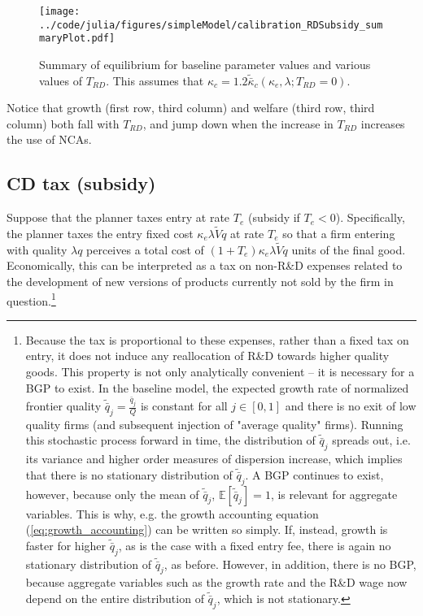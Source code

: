 \documentclass[11pt,english]{article}
\theoremstyle{remark}
\begin{document}
\begin{figure}[]
	\texttt{[image: ../code/julia/figures/simpleModel/calibration\_RDSubsidy\_summaryPlot.pdf]}
	\caption{Summary of equilibrium for baseline parameter values and various values of $T_{RD}$. This assumes that $\kappa_c = 1.2 \tilde{\bar{\kappa}}_c(\kappa_e,\lambda;T_{RD} = 0)$.}
	\label{calibration_RDSubsidy_summaryPlot}
\end{figure}

Notice that growth (first row, third column) and welfare (third row, third column) both fall with $T_{RD}$, and jump down when the increase in $T_{RD}$ increases the use of NCAs.


\subsection{CD tax (subsidy)}\label{subsec:cd_tax}

Suppose that the planner taxes entry at rate $T_e$ (subsidy if $T_e < 0$). Specifically, the planner taxes the entry fixed cost $\kappa_e \lambda \tilde{V} q$ at rate $T_e$ so that a firm entering with quality $\lambda q$ perceives a total cost of $(1+T_e) \kappa_e \lambda \tilde{V}q$ units of the final good. Economically, this can be interpreted as a tax on non-R\&D expenses related to the development of new versions of products currently not sold by the firm in question.\footnote{Because the tax is proportional to these expenses, rather than a fixed tax on entry, it does not induce any reallocation of R\&D towards higher quality goods. This property is not only analytically convenient -- it is necessary for a BGP to exist. In the baseline model, the expected growth rate of normalized frontier quality $\tilde{\bar{q}}_j = \frac{\bar{q}_j}{Q}$ is constant for all $j \in [0,1]$ and there is no exit of low quality firms (and subsequent injection of "average quality" firms). Running this stochastic process forward in time, the distribution of $\tilde{\bar{q}}_j$ spreads out, i.e. its variance and higher order measures of dispersion increase, which implies that there is no stationary distribution of $\tilde{\bar{q}}_j$. A BGP continues to exist, however, because only the mean of $\tilde{\bar{q}}_j$, $\mathbb{E}[\tilde{\bar{q}}_j] = 1$, is relevant for aggregate variables. This is why, e.g. the growth accounting equation (\ref{eq:growth_accounting}) can be written so simply. If, instead, growth is faster for higher $\tilde{\bar{q}}_j$, as is the case with a fixed entry fee, there is again no stationary distribution of $\tilde{\bar{q}}_j$, as before. However, in addition, there is no BGP, because aggregate variables such as the growth rate and the R\&D wage now depend on the entire distribution of $\tilde{\bar{q}}_j$, which is not stationary.}
\end{document}
